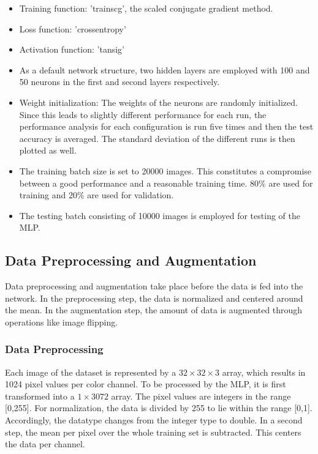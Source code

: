 \begin{itemize}
	\item Training function: 'trainscg', the scaled conjugate gradient method.

	\item Loss function: 'crossentropy'

	\item Activation function: 'tansig'

	\item As a default network structure, two hidden layers are employed with 100 and 50 neurons in the first and second layers respectively.

	\item Weight initialization: The weights of the neurons are randomly initialized. Since this leads to slightly different performance for each run, the performance analysis for each configuration is run five times and then the test accuracy is averaged. The standard deviation of the different runs is then plotted as well.

	\item The training batch size is set to 20000 images. This constitutes a compromise between a good performance and a reasonable training time. 80\% are used for training and 20\% are used for validation.

	\item The testing batch consisting of 10000 images is employed for testing of the MLP.
\end{itemize}

\FloatBarrier
\subsection{Data Preprocessing and Augmentation}\label{subsec:preProp}

Data preprocessing and augmentation take place before the data is fed into the network. In the preprocessing step, the data is normalized and centered around the mean. In the augmentation step, the amount of data is augmented through operations like image flipping.

\subsubsection{Data Preprocessing}\label{subsub:dataPreProp}

  	Each image of the dataset is represented by a $32\times32\times3$ array, which results in 1024 pixel values per color channel. To be processed by the MLP, it is first transformed into a $1\times3072$ array. The pixel values are integers in the range [0,255]. For normalization, the data is divided by 255 to lie within the range [0,1]. Accordingly, the datatype changes from the integer type to double. In a second step, the mean per pixel over the whole training set is subtracted. This centers the data per channel.

